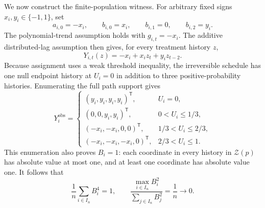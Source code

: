 We now construct the finite-population witness.  For arbitrary fixed signs \(x_i,y_i\in\{-1,1\}\), set
\[
a_{i,0}=-x_i,\qquad b_{i,0}=x_i,\qquad b_{i,1}=0,
\qquad b_{i,2}=y_i.
\]
The polynomial-trend assumption holds with \(g_{i,t}=-x_i\).  The additive distributed-lag assumption then gives, for every treatment history \(z\),
\[
Y_{i,t}(z)=-x_i+x_i z_t+y_i z_{t-2}.
\]
Because assignment uses a weak threshold inequality, the irreversible schedule has one null endpoint history at \(U_i=0\) in addition to three positive-probability histories.  Enumerating the full path support gives
\[
Y_i^{\mathrm{obs}}=
\begin{cases}
(y_i,y_i,y_i,y_i)^{\mathsf T},&U_i=0,\\
(0,0,y_i,y_i)^{\mathsf T},&0<U_i\le1/3,\\
(-x_i,-x_i,0,0)^{\mathsf T},&1/3<U_i\le2/3,\\
(-x_i,-x_i,-x_i,0)^{\mathsf T},&2/3<U_i\le1.
\end{cases}
\tag{1}
\]
This enumeration also proves \(B_i=1\): each coordinate in every history in \(\mathcal Z(p)\) has absolute value at most one, and at least one coordinate has absolute value one.  It follows that
\[
\frac1n\sum_{i\in I_n}B_i^4=1,
\qquad
\frac{\max_{i\in I_n}B_i^2}{\sum_{j\in I_n}B_j^2}=\frac1n\longrightarrow0.
\]
